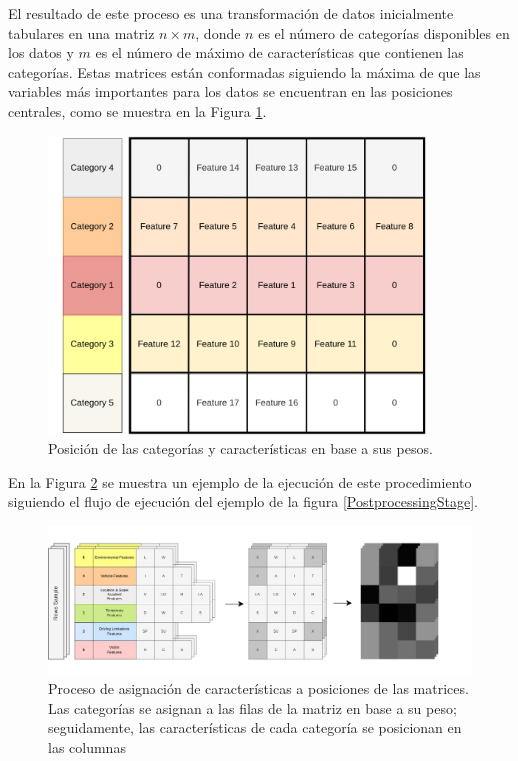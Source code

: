 El resultado de este proceso es una transformación de datos inicialmente tabulares en una matriz $n \times m$, donde $n$ es el número de categorías disponibles en los datos y $m$ es el número de máximo de características que contienen las categorías. Estas matrices están conformadas siguiendo la máxima de que las variables más importantes para los datos se encuentran en las posiciones centrales, como se muestra en la Figura \ref{MatrixIndexes}.


\begin{figure}[H]
	\centering
	\includegraphics[width=10cm]{Figures/indexing_positions_2.png}
	\caption{Posición de las categorías y características en base a sus pesos.}
	\label{MatrixIndexes}
\end{figure}

En la Figura \ref{MatrixConstruction} se muestra un ejemplo de la ejecución de este procedimiento siguiendo el flujo de ejecución del ejemplo de la figura \ref{PostprocessingStage}.

\begin{figure}[H]
	\centering
	\includegraphics[width=15cm]{Figures/Matrix Construction_2.png}
	\caption{Proceso de asignación de características a posiciones de las matrices. Las categorías se asignan a las filas de la matriz en base a su peso; seguidamente, las características de cada categoría se posicionan en las columnas}
	\label{MatrixConstruction}
\end{figure}

